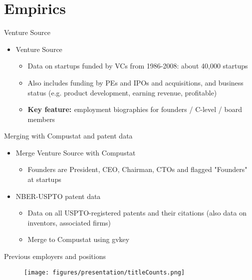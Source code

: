 \documentclass[english,usenames,dvipsnames]{beamer}
\begin{document}
\section{Empirics}

\begin{frame}
\tableofcontents[currentsection]
\end{frame}



\begin{frame}{Venture Source}
\begin{itemize}
	\item Venture Source
	\begin{itemize}
		\item Data on startups funded by VCs from 1986-2008: about 40,000 startups
		\item Also includes funding by PEs and IPOs and acquisitions, and business status (e.g. product development, earning revenue, profitable)
		\item \textbf{\alert{Key feature: }} employment biographies for founders / C-level / board members \\
	\end{itemize}
\end{itemize}
\end{frame}

\begin{frame}{Merging with Compustat and patent data}
\begin{itemize}
\item Merge Venture Source with Compustat
\begin{itemize}
	\item Founders are President, CEO, Chairman, CTOs and flagged "Founders" at startups
\end{itemize}
\item NBER-USPTO patent data
\begin{itemize}
	\item Data on all USPTO-registered patents and their citations (also data on inventors, associated firms)
	\item Merge to Compustat using gvkey
\end{itemize}
\end{itemize}
\end{frame}
\begin{frame}{Previous employers and positions}
	\begin{figure}
		\texttt{[image: figures/presentation/titleCounts.png]}
	\end{figure}
\end{frame}
\end{document}
